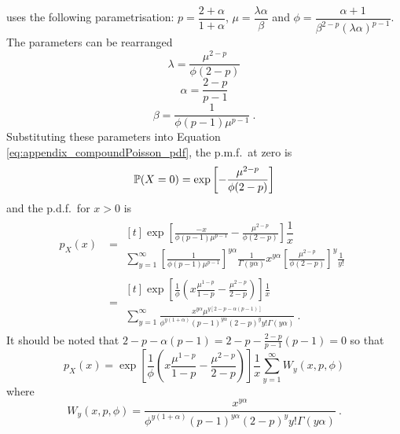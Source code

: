 \cite{jorgensen1987exponential} uses the following parametrisation: $p=\dfrac{2+\alpha}{1+\alpha}$, $\mu=\dfrac{\lambda\alpha}{\beta}$ and $\phi = \dfrac{\alpha+1}{\beta^{2-p}(\lambda\alpha)^{p-1}}$. The parameters can be rearranged
\begin{equation}
  \lambda=\frac{\mu^{2-p}}{\phi(2-p)}
\end{equation}
\begin{equation}
  \alpha=\frac{2-p}{p-1}
\end{equation}
\begin{equation}
  \beta=\frac{1}{\phi(p-1)\mu^{p-1}} \ .
\end{equation}
Substituting these parameters into Equation \eqref{eq:appendix_compoundPoisson_pdf}, the p.m.f.~at zero is
\begin{equation}
  \operatorname{\mathbb{P}}(X=0) = \exp
  \left[
      -\frac{\mu^{2-p}}{\phi(2-p)}
  \right]
\end{equation}
and the p.d.f.~for $x>0$ is
\begin{align*}
  p_X(x) &=
  \begin{multlined}[t]
    \exp\left[
        \frac{-x}{\phi(p-1)\mu^{p-1}}
        -\frac{\mu^{2-p}}{\phi(2-p)}
    \right]
    \dfrac{1}{x}
    \\
    \sum_{y=1}^{\infty}
    \left[
      \frac{1}{\phi(p-1)\mu^{p-1}}
    \right]^{y\alpha}
    \frac{1}{\Gamma(y\alpha)}
    x^{y\alpha}
    \left[
      \frac{\mu^{2-p}}{\phi(2-p)}
    \right]^y
    \frac{1}{y!}
  \end{multlined}
  \\
  &= 
  \begin{multlined}[t]
    \exp\left[
      \frac{1}{\phi}\left(x\frac{\mu^{1-p}}{1-p}-\frac{\mu^{2-p}}{2-p}\right)
    \right]
    \frac{1}{x}
    \\
    \sum_{y=1}^{\infty}\frac{x^{y\alpha}\mu^{y[2-p-\alpha(p-1)]}}{\phi^{y(1+\alpha)}(p-1)^{y\alpha}(2-p)^yy!\Gamma(y\alpha)}
    \ .
  \end{multlined}
\end{align*}
It should be noted that $2-p-\alpha(p-1) = 2-p - \frac{2-p}{p-1}(p-1) =0$ so that
\begin{equation}
  p_X(x) = 
  \exp\left[
    \frac{1}{\phi}
    \left(
      x\frac{\mu^{1-p}}{1-p}-\frac{\mu^{2-p}}{2-p}
    \right)
  \right]
  \frac{1}{x}
  \sum_{y=1}^{\infty}W_y(x,p,\phi)
\end{equation}
where
\begin{equation}
  W_y(x,p,\phi)=\frac{x^{y\alpha}}{\phi^{y(1+\alpha)}(p-1)^{y\alpha}(2-p)^yy!\Gamma(y\alpha)}
  \ .
\end{equation}

